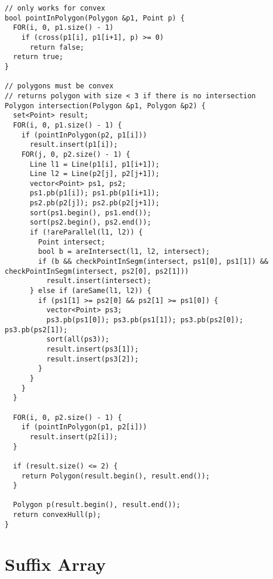 \documentclass[8pt, oneside]{extarticle}
\begin{document}
\begin{multicols}{3}
\begin{lstlisting}
// only works for convex
bool pointInPolygon(Polygon &p1, Point p) {
  FOR(i, 0, p1.size() - 1)
    if (cross(p1[i], p1[i+1], p) >= 0)
      return false;
  return true;
}

// polygons must be convex
// returns polygon with size < 3 if there is no intersection
Polygon intersection(Polygon &p1, Polygon &p2) {
  set<Point> result;
  FOR(i, 0, p1.size() - 1) {
    if (pointInPolygon(p2, p1[i]))
      result.insert(p1[i]);
    FOR(j, 0, p2.size() - 1) {
      Line l1 = Line(p1[i], p1[i+1]);
      Line l2 = Line(p2[j], p2[j+1]);
      vector<Point> ps1, ps2;
      ps1.pb(p1[i]); ps1.pb(p1[i+1]);
      ps2.pb(p2[j]); ps2.pb(p2[j+1]);
      sort(ps1.begin(), ps1.end());
      sort(ps2.begin(), ps2.end());
      if (!areParallel(l1, l2)) {
        Point intersect;
        bool b = areIntersect(l1, l2, intersect);
        if (b && checkPointInSegm(intersect, ps1[0], ps1[1]) && checkPointInSegm(intersect, ps2[0], ps2[1]))
          result.insert(intersect);          
      } else if (areSame(l1, l2)) {
        if (ps1[1] >= ps2[0] && ps2[1] >= ps1[0]) {
          vector<Point> ps3;
          ps3.pb(ps1[0]); ps3.pb(ps1[1]); ps3.pb(ps2[0]); ps3.pb(ps2[1]);
          sort(all(ps3));
          result.insert(ps3[1]);
          result.insert(ps3[2]);
        }
      }
    }
  }

  FOR(i, 0, p2.size() - 1) {
    if (pointInPolygon(p1, p2[i]))
      result.insert(p2[i]);
  }

  if (result.size() <= 2) {
    return Polygon(result.begin(), result.end());
  }

  Polygon p(result.begin(), result.end());
  return convexHull(p);
}
\end{lstlisting}

\section{Suffix Array}


\end{multicols}
\end{document}
